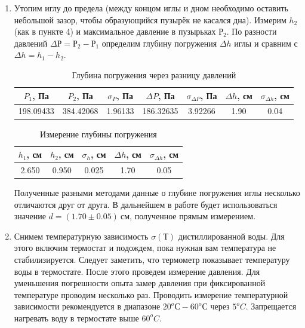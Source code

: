 \documentclass[12pt,a4paper]{article}
\begin{document}
\begin{enumerate}
    \item Утопим иглу до предела (между концом иглы и дном необходимо оставить небольшой зазор, чтобы образующийся пузырёк не касался дна). Измерим $h_2$ (как в пункте 4) и максимальное давление в пузырьках $Р_2$.
    По разности давлений $\Delta Р = Р_2 - Р_1$ определим глубину погружения $\Delta h$ иглы и сравним с $\Delta h =  h_1- h_2$.
    
    \begin{table}[ht]
        \centering
        \begin{tabular}{|c|c|c|c|c|c|c|}
            \hline
             $P_1$, Па & $P_2$, Па & $\sigma_P$, Па & $\Delta P$, Па & $\sigma_{\Delta P}$, Па & $\Delta h$, см & $\sigma_{\Delta h}$,  см \\
             \hline
             198.09433& 384.42068& 1.96133 & 186.32635&3.92266 & 1.90& 0.04\\
             \hline 
        \end{tabular}
        \caption{Глубина погружения через разницу давлений}
    \end{table}
    
    \begin{table}[ht]
        \centering
        \begin{tabular}{|c|c|c|c|c|}
        \hline
            $h_1$, см & $h_2$, см & $\sigma_h$, см & $\Delta h$, см & $\sigma_{\Delta h}$, см  \\
            \hline
             2.650& 0.950 & 0.025&1.70 & 0.05\\
            \hline
        \end{tabular}
        \caption{Измерение глубины погружения}
    \end{table}

    Полученные разными методами данные о глубине погружения иглы несколько отличаются друг от друга. В дальнейшем в работе будет использоваться значение $d = (1.70\pm 0.05)\ см$, полученное прямым измерением.
    
    \item Снимем температурную зависимость $\sigma (Т)$ дистиллированной воды. 
    Для этого включим термостат и подождем, пока нужная вам температура не стабилизируется. 
    Следует заметить, что термометр показывает температуру воды в термостате. 
    После этого проведем измерение давления. 
    Для уменьшения погрешности опыта замер давления при фиксированной температуре проводим несколько раз. 
    Проводить измерение температурной зависимости  рекомендуется в диапазоне  $20^oС - 60^oС$ через $5^oC$. 
    Запрещается нагревать воду в термостате выше $60^oC$.
    

\end{enumerate}
\end{document}
